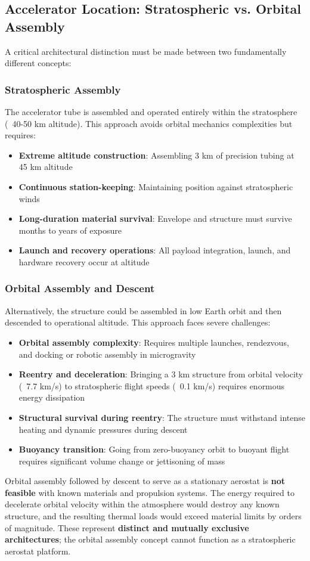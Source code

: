 \subsection{Accelerator Location: Stratospheric vs. Orbital Assembly}
A critical architectural distinction must be made between two fundamentally different concepts:

\subsubsection{Stratospheric Assembly}
The accelerator tube is assembled and operated entirely within the stratosphere (~40-50 km altitude). This approach avoids orbital mechanics complexities but requires:
\begin{itemize}
    \item \textbf{Extreme altitude construction}: Assembling 3 km of precision tubing at 45 km altitude
    \item \textbf{Continuous station-keeping}: Maintaining position against stratospheric winds
    \item \textbf{Long-duration material survival}: Envelope and structure must survive months to years of exposure
    \item \textbf{Launch and recovery operations}: All payload integration, launch, and hardware recovery occur at altitude
\end{itemize}

\subsubsection{Orbital Assembly and Descent}
Alternatively, the structure could be assembled in low Earth orbit and then descended to operational altitude. This approach faces severe challenges:
\begin{itemize}
    \item \textbf{Orbital assembly complexity}: Requires multiple launches, rendezvous, and docking or robotic assembly in microgravity
    \item \textbf{Reentry and deceleration}: Bringing a 3 km structure from orbital velocity (~7.7 km/s) to stratospheric flight speeds (~0.1 km/s) requires enormous energy dissipation
    \item \textbf{Structural survival during reentry}: The structure must withstand intense heating and dynamic pressures during descent
    \item \textbf{Buoyancy transition}: Going from zero-buoyancy orbit to buoyant flight requires significant volume change or jettisoning of mass
\end{itemize}
Orbital assembly followed by descent to serve as a stationary aerostat is \textbf{not feasible} with known materials and propulsion systems. The energy required to decelerate orbital velocity within the atmosphere would destroy any known structure, and the resulting thermal loads would exceed material limits by orders of magnitude. These represent \textbf{distinct and mutually exclusive architectures}; the orbital assembly concept cannot function as a stratospheric aerostat platform.

